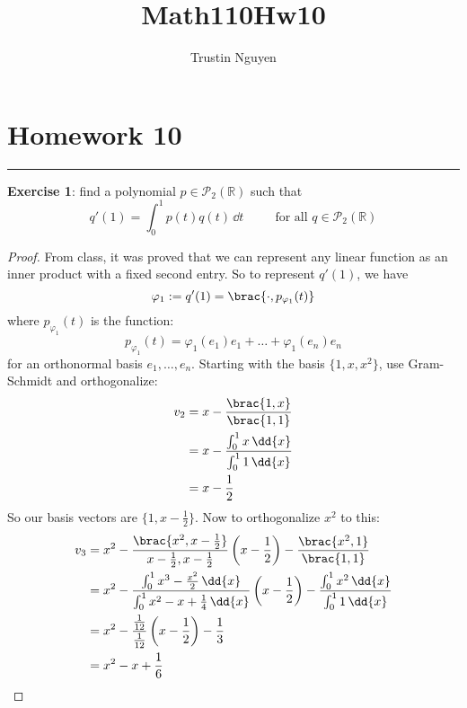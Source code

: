 \documentclass{article}
\title{Math110Hw10}
\author{Trustin Nguyen}
\begin{document}
\maketitle

\section*{Homework 10}
\hrule
\textbf{Exercise 1}: find a polynomial $p \in \mathcal{P}_{2}(\mathbb{R})$ such that 
\begin{equation*}
	q'(1) = \int_{0}^{1} p(t)q(t) \,\dd{t} \hspace{30pt} \text{for all $q \in \mathcal{P}_{2}(\mathbb{R})$} 
\end{equation*}
\begin{proof}
	From class, it was proved that we can represent any linear function as an inner product with a fixed second entry. So to represent $q'(1)$, we have
	\begin{equation*}
		\varphi_{1} := q'(1) = \brac{\cdot, p_{\varphi_{1}}(t)}
	\end{equation*}
	where $p_{\varphi_{1}}(t)$ is the function:
	\begin{equation*}
		p_{\varphi_{1}}(t) = \varphi_{1}(e_{1})e_{1} + \ldots + \varphi_{1}(e_{n})e_{n}
	\end{equation*}
	for an orthonormal basis $e_{1}, \ldots, e_{n}$. Starting with the basis $\{1, x, x^{2}\}$, use Gram-Schmidt and orthogonalize:
	\begin{align*}
		v_{2} &= x - \dfrac{\brac{1, x}}{\brac{1, 1}} \\
			&= x - \dfrac{\int_{0}^{1} x \,\dd{x}}{\int_{0}^{1} 1 \,\dd{x}} \\
			&= x - \dfrac{1}{2}
	\end{align*}
	So our basis vectors are $\{1, x - \frac{1}{2}\}$. Now to orthogonalize $x^{2}$ to this:
	\begin{align*}
		v_{3} &= x^{2} - \dfrac{\brac{x^{2}, x - \frac{1}{2}}}{x - \frac{1}{2}, x - \frac{1}{2}}\left(x - \dfrac{1}{2}\right) - \dfrac{\brac{x^{2}, 1}}{\brac{1,1}} \\
		      &= x^{2} - \dfrac{\int_{0}^{1}x^{3} - \frac{x^{2}}{2} \,\dd{x}}{\int_{0}^{1} x^{2} - x + \frac{1}{4} \,\dd{x}}\left(x - \dfrac{1}{2}\right) - \dfrac{\int_{0}^{1} x^{2} \,\dd{x}}{\int_{0}^{1} 1 \,\dd{x}} \\
		      &= x^{2} - \dfrac{\frac{1}{12}}{\frac{1}{12}}\left(x - \dfrac{1}{2}\right) - \dfrac{1}{3} \\
		      &= x^{2} - x + \dfrac{1}{6}

\end{align*}
\end{proof}
\end{document}

